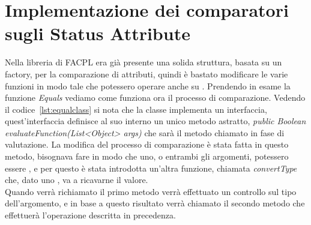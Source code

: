 \section{Implementazione dei comparatori sugli Status Attribute} %
\label{sec:implementazione_dei_comparatori_sugli_status_attribute}
Nella libreria di FACPL era già presente una solida struttura, basata su un factory, per la comparazione di attributi, quindi è bastato modificare le varie funzioni in modo tale che potessero operare anche su \statusattribute.
Prendendo in esame la funzione \textit{Equals} vediamo come funziona ora il processo di comparazione.
Vedendo il codice~\ref{lst:equalclass} si nota che la classe implementa un interfaccia, quest'interfaccia definisce al suo interno un unico metodo astratto, \textit{public Boolean evaluateFunction(List<Object> args)} che sarà il metodo chiamato in fase di valutazione.
La modifica del processo di comparazione è stata fatta in questo metodo, bisognava fare in modo che uno, o entrambi gli argomenti, potessero essere \statusattribute, e per questo è stata introdotta un'altra funzione, chiamata \textit{convertType} che, dato uno \statusattribute, va a ricavarne il valore.\\
Quando verrà richiamato il primo metodo verrà effettuato un controllo sul tipo dell'argomento, e in base a questo risultato verrà chiamato il secondo metodo che effettuerà l'operazione descritta in precedenza.



